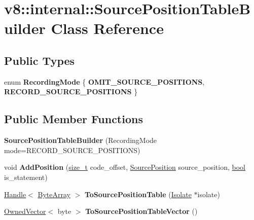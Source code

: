 \hypertarget{classv8_1_1internal_1_1SourcePositionTableBuilder}{}\section{v8\+:\+:internal\+:\+:Source\+Position\+Table\+Builder Class Reference}
\label{classv8_1_1internal_1_1SourcePositionTableBuilder}
\subsection*{Public Types}
\begin{DoxyCompactItemize}
\item 
\mbox{\label{classv8_1_1internal_1_1SourcePositionTableBuilder_ace5e6d700c3b9e619441897f31646581}} 
enum {\bfseries Recording\+Mode} \{ {\bfseries O\+M\+I\+T\+\_\+\+S\+O\+U\+R\+C\+E\+\_\+\+P\+O\+S\+I\+T\+I\+O\+NS}, 
{\bfseries R\+E\+C\+O\+R\+D\+\_\+\+S\+O\+U\+R\+C\+E\+\_\+\+P\+O\+S\+I\+T\+I\+O\+NS}
 \}
\end{DoxyCompactItemize}
\subsection*{Public Member Functions}
\begin{DoxyCompactItemize}
\item 
\mbox{\label{classv8_1_1internal_1_1SourcePositionTableBuilder_aff2d448352e4e56f32a23fae0d26b0ff}} 
{\bfseries Source\+Position\+Table\+Builder} (Recording\+Mode mode=R\+E\+C\+O\+R\+D\+\_\+\+S\+O\+U\+R\+C\+E\+\_\+\+P\+O\+S\+I\+T\+I\+O\+NS)
\item 
\mbox{\label{classv8_1_1internal_1_1SourcePositionTableBuilder_a9862cb855e53225e5c104a1a095fdc60}} 
void {\bfseries Add\+Position} (\mbox{\hyperlink{classsize__t}{size\+\_\+t}} code\+\_\+offset, \mbox{\hyperlink{classv8_1_1internal_1_1SourcePosition}{Source\+Position}} source\+\_\+position, \mbox{\hyperlink{classbool}{bool}} is\+\_\+statement)
\item 
\mbox{\label{classv8_1_1internal_1_1SourcePositionTableBuilder_a344b238018819f6490aabb0c6fdbc8fb}} 
\mbox{\hyperlink{classv8_1_1internal_1_1Handle}{Handle}}$<$ \mbox{\hyperlink{classv8_1_1internal_1_1ByteArray}{Byte\+Array}} $>$ {\bfseries To\+Source\+Position\+Table} (\mbox{\hyperlink{classv8_1_1internal_1_1Isolate}{Isolate}} $\ast$isolate)
\item 
\mbox{\label{classv8_1_1internal_1_1SourcePositionTableBuilder_a596a6268ea743fb22c1fe44c15b66672}} 
\mbox{\hyperlink{classv8_1_1internal_1_1OwnedVector}{Owned\+Vector}}$<$ byte $>$ {\bfseries To\+Source\+Position\+Table\+Vector} ()
\end{DoxyCompactItemize}


